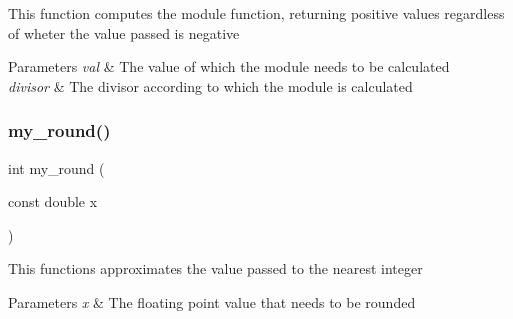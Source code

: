 This function computes the module function, returning positive values regardless of wheter the value passed is negative


\begin{DoxyParams}{Parameters}
{\em val} & The value of which the module needs to be calculated \\
\hline
{\em divisor} & The divisor according to which the module is calculated \\
\hline
\end{DoxyParams}
\mbox{\label{utils_8h_a1ea4108a2c530470624ce2678e65dcef}} 
\subsubsection{my\+\_\+round()}
{\footnotesize\ttfamily int my\+\_\+round (\begin{DoxyParamCaption}\item[{const double}]{x }\end{DoxyParamCaption})}

This functions approximates the value passed to the nearest integer


\begin{DoxyParams}{Parameters}
{\em x} & The floating point value that needs to be rounded \\
\hline
\end{DoxyParams}
